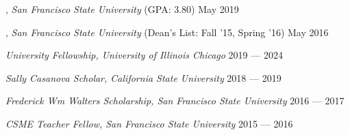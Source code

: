 
, \textit{San Francisco State University} (GPA: 3.80)	\hfill May 2019

, \textit{San Francisco State University} (Dean's List: Fall '15, Spring '16) \hfill	May 2016

\textit{University Fellowship, University of Illinois Chicago} 	\hfill 2019 --- 2024

\textit{Sally Casanova Scholar, California State University} \hfill	2018 --- 2019

\textit{Frederick Wm Walters Scholarship, San Francisco State University}	\hfill 2016 --- 2017

\textit{CSME Teacher Fellow, San Francisco State University} \hfill	2015 --- 2016


